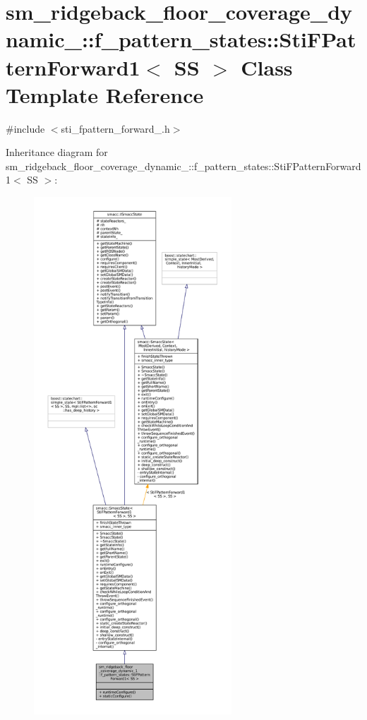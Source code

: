 \hypertarget{structsm__ridgeback__floor__coverage__dynamic__1_1_1f__pattern__states_1_1StiFPatternForward1}{}\section{sm\+\_\+ridgeback\+\_\+floor\+\_\+coverage\+\_\+dynamic\+\_\+:\+:f\+\_\+pattern\+\_\+states\+:\+:Sti\+F\+Pattern\+Forward1$<$ SS $>$ Class Template Reference}
\label{structsm__ridgeback__floor__coverage__dynamic__1_1_1f__pattern__states_1_1StiFPatternForward1}


{\ttfamily \#include $<$sti\+\_\+fpattern\+\_\+forward\+\_.\+h$>$}



Inheritance diagram for sm\+\_\+ridgeback\+\_\+floor\+\_\+coverage\+\_\+dynamic\+\_\+:\+:f\+\_\+pattern\+\_\+states\+:\+:Sti\+F\+Pattern\+Forward1$<$ SS $>$\+:
\nopagebreak
\begin{figure}[H]
\begin{center}
\leavevmode
\includegraphics[height=550pt]{structsm__ridgeback__floor__coverage__dynamic__1_1_1f__pattern__states_1_1StiFPatternForward1__inherit__graph}
\end{center}
\end{figure}


